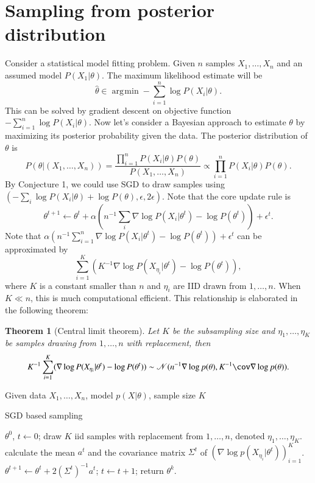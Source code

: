 \documentclass[preprint,12pt,3p]{elsarticle}
\newcommand{\N}{\mathscr{N}}
\DeclareMathOperator*{\argmin}{\arg\!\min}
\newtheorem{theorem}{Theorem}
\begin{document}
\section{Sampling from posterior distribution}
Consider a statistical model fitting problem. Given $n$ samples $X_1,\ldots, X_n$ and an assumed model $P(X_1|\theta)$. The maximum likelihood estimate will be
\[
\hat{\theta} \in \argmin - \sum_{i=1}^n \log P(X_i|\theta).
\]
This can be solved by gradient descent on objective function $- \sum_{i=1}^n \log P(X_i|\theta)$. Now let's consider a Bayesian approach to estimate $\theta$ by maximizing its posterior probability given the data. The posterior distribution of $\theta$ is
\[
P(\theta|(X_1,\ldots, X_n)) = \frac{\prod_{i=1}^n P(X_i|\theta) P(\theta)}{P(X_1,\ldots, X_n)} \propto \prod_{i=1}^n P(X_i|\theta) P(\theta).
\]
By Conjecture 1, we could use SGD to draw samples using $(-\sum_i \log P(X_i|\theta) + \log P(\theta), \epsilon, 2\epsilon)$.  Note that the core update rule is
\[
\theta^{t+1} \gets \theta^{t} + \alpha (n^{-1} \sum_i \nabla \log P(X_i|\theta^t) - \log P(\theta^t)) + \epsilon^t.
\]
Note that $\alpha (n^{-1} \sum_{i=1}^n \nabla \log P(X_i|\theta^t) - \log P(\theta^t)) + \epsilon^t$ can be approximated by
\[
\sum_{i=1}^K (K^{-1} \nabla \log P(X_{\eta_i}|\theta^t) - \log P(\theta^t)),
\]
where $K$ is a constant smaller than $n$ and $\eta_i$ are IID drawn from $1,\ldots, n$. When $K\ll n$, this is much computational efficient. This relationship is elaborated in the following theorem:
\begin{theorem}[Central limit theorem]
Let $K$ be the subsampling size and $\eta_1,\ldots, \eta_K$ be samples drawing from $1,\ldots, n$ with replacement, then
\[
K^{-1}\sum_{i=1}^K (\nabla \log P(X_{\eta_i}|\theta^t) - \log P(\theta^t)) \sim \N(n^{-1} \nabla \log p(\theta) , K^{-1}\cov \nabla \log p(\theta)).
\]
\end{theorem}

\begin{algorithm}
{\small
Given data $X_1,\ldots, X_n$, model $p(X|\theta)$, sample size $K$
\begin{algorithmic}\caption{SGD based sampling}\label{Alg:SGD_Sampling}
 $ \theta^0$, $t \gets 0$;
\STATE draw $K$ iid samples with replacement from $1,\ldots, n$, denoted $\eta_1,\ldots, \eta_K$.
\STATE calculate the mean $a^t$ and the covariance matrix $\Sigma^t$ of $(\nabla\log p(X_{\eta_i}|\theta^t))_{i=1}^K$.
\STATE
$\theta^{t+1} \gets \theta^t + 2(\Sigma^t)^{-1}a^t$;
\STATE $t\gets t+1$;
\ENDWHILE
\STATE return $\theta^k$.
\end{algorithmic}}
\end{algorithm}
\end{document}
